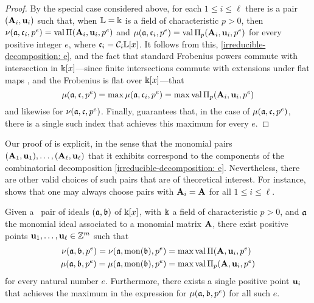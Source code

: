 \documentclass{amsart}
\begin{document}
\begin{proof}
By the special case considered above, for each $1\le i \le \ell$ there is a pair $(\mathbf{A}_i, \mathbf{u}_i)$ such that, when $\mathbb{L}=\Bbbk$ is a field of characteristic $p>0$, then $\nu(\mathfrak{a}, \mathfrak{c}_i, p^e) = \operatorname{val} \Pi(\mathbf{A}_i, \mathbf{u}_i, p^e)$ and $\mu(\mathfrak{a}, \mathfrak{c}_i, p^e) = \operatorname{val} \Pi_p(\mathbf{A}_i, \mathbf{u}_i, p^e)$ for every positive integer $e$, where $\mathfrak{c}_i = \mathcal{C}_i \mathbb{L}[x]$.    It follows from this, \eqref{irreducible-decomposition: e}, and the fact that standard Frobenius powers commute with intersection in $\Bbbk[x]$---since finite intersections commute with extensions under flat maps \cite[Theorem~7.4(ii)]{matsumura}, and the Frobenius is flat over $\Bbbk[x]$---that
\[ \mu(\mathfrak{a}, \mathfrak{c}, p^e) = \max  \mu(\mathfrak{a}, \mathfrak{c}_i, p^e)  = \max \operatorname{val} \Pi_p(\mathbf{A}_i, \mathbf{u}_i, p^e) \] and likewise for $\nu(\mathfrak{a}, \mathfrak{c}, p^e)$.  Finally,   guarantees that, in the case of $\mu(\mathfrak{a}, \mathfrak{c}, p^e)$, there is a single such index that achieves this maximum for every $e$.
\end{proof}

\begin{remark}
\label{lifting pairs: R}
{Our proof of}  is explicit, in the sense that the monomial pairs $(\mathbf{A}_1, \mathbf{u}_1), \ldots, (\mathbf{A}_{\ell}, \mathbf{u}_{\ell})$ that it exhibits correspond to the components of the combinatorial decomposition \eqref{irreducible-decomposition: e}.  Nevertheless, there are other valid choices of such pairs that are of theoretical interest.
For instance,   shows that one may always choose pairs with $\mathbf{A}_i=\mathbf{A}$ for all $1 \leq i \leq \ell$.
\end{remark}

\begin{theorem}%
   \label{reduce-to-monomial-case: T}
   Given a \compatible\ pair of ideals $(\mathfrak{a}, \mathfrak{b})$ of $\Bbbk[x]$, with $\Bbbk$ a field of characteristic $p>0$, and $\mathfrak{a}$ the monomial ideal associated to a monomial matrix $\mathbf{A}$, there exist positive points $\mathbf{u}_1, \ldots, \mathbf{u}_{\ell} \in \mathbb{Z}^m$ such that
\begin{align*} 
\nu(\mathfrak{a}, \mathfrak{b}, p^e) = \nu(\mathfrak{a}, \operatorname{mon}(\mathfrak{b}), p^e) & = \max \operatorname{val} \Pi(\mathbf{A},\mathbf{u}_i, p^e) \\ 
\mu(\mathfrak{a}, \mathfrak{b}, p^e) = \mu(\mathfrak{a}, \operatorname{mon}(\mathfrak{b}), p^e) & = \max \operatorname{val} \Pi_p(\mathbf{A},\mathbf{u}_i, p^e)
\end{align*}
%
for every natural number $e$.  Furthermore, there exists a single positive point $\mathbf{u}_i$ that achieves the maximum in the expression for $\mu(\mathfrak{a}, \mathfrak{b}, p^e)$ for all such $e$.
\end{theorem}
\end{document}
